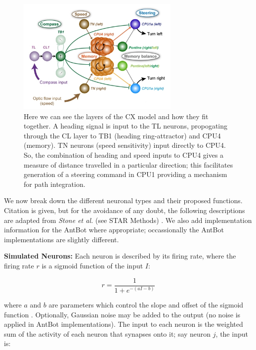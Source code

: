 \documentclass[a4paper,11pt,twoside,openright]{article}
\begin{document}
\begin{figure}[h!]
  \centering
  \includegraphics[width=0.7\textwidth]{Figure5F}
  \caption{
    \label{fig:cxlayer} Here we can see the layers of the CX model and
    how they fit together. A heading signal is input to the TL neurons,
    propogating through the CL layer to TB1 (heading ring-attractor) and
    CPU4 (memory). TN neurons (speed sensitivity) input directly to CPU4.
    So, the combination of heading and speed inputs to CPU4 gives a measure
    of distance travelled in a particular direction; this facilitates generation
    of a steering command in CPU1 providing a mechanism for path integration.
  }
\end{figure}

We now break down the different neuronal types and their proposed functions.
Citation is given, but for the avoidance of any doubt, the following descriptions
are adapted from \textit{Stone et al.} (see STAR Methods) \cite{Stone2017}.
We also add implementation information for the AntBot where appropriate;
occassionally the AntBot implementations are slightly different.
\newline
\par

\textbf{Simulated Neurons:}
Each neuron is described by its firing rate, where the firing rate $r$ is
a sigmoid function of the input $I$:

\begin{equation}\label{eq:sig}
r = \frac{1}{1 + e^{-(aI - b)}}
\end{equation}

where $a$ and $b$ are parameters which control the slope and offset of
the sigmoid function \cite{Stone2017}. Optionally, Gaussian noise may
be added to the output (no noise is applied in AntBot
implementations). The input to each neuron is the weighted sum of the
activity of each neuron that synapses onto it; say neuron $j$, the
input is:
\end{document}

